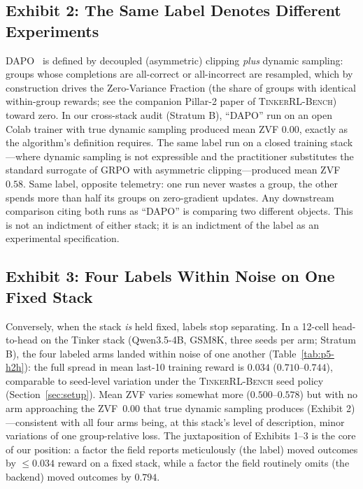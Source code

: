 \documentclass{article}  \usepackage[preprint,nonatbib]{neurips_2026} \usepackage[numbers]{natbib}
\newcommand{\ours}{\textsc{TinkerRL-Bench}}
\providecommand{\tableref}[1]{Table~\ref{#1}}
\providecommand{\secref}[1]{Section~\ref{#1}}
\begin{document}
\subsection{Exhibit 2: The Same Label Denotes Different Experiments}
\label{sec:p5-exhibit-label}
DAPO~\citep{yu2025dapo} is defined by decoupled (asymmetric) clipping
\emph{plus} dynamic sampling: groups whose completions are all-correct or
all-incorrect are resampled, which by construction drives the Zero-Variance
Fraction (the share of groups with identical within-group rewards; see the
companion Pillar-2 paper of \ours{}) toward zero. In our cross-stack audit
(Stratum B), ``DAPO'' run on an open Colab trainer with true dynamic sampling
produced mean ZVF $0.00$, exactly as the algorithm's definition requires. The
same label run on a closed training stack---where dynamic sampling is not
expressible and the practitioner substitutes the standard surrogate of GRPO
with asymmetric clipping---produced mean ZVF $0.58$. Same label, opposite
telemetry: one run never wastes a group, the other spends more than half its
groups on zero-gradient updates. Any downstream comparison citing both runs as
``DAPO'' is comparing two different objects. This is not an indictment of
either stack; it is an indictment of the label as an experimental
specification.

\subsection{Exhibit 3: Four Labels Within Noise on One Fixed Stack}
\label{sec:p5-exhibit-h2h}
Conversely, when the stack \emph{is} held fixed, labels stop separating. In a
12-cell head-to-head on the Tinker stack (Qwen3.5-4B, GSM8K, three seeds per
arm; Stratum B), the four labeled arms landed within noise of one another
(\tableref{tab:p5-h2h}): the full spread in mean last-10 training reward is
$0.034$ ($0.710$--$0.744$), comparable to seed-level variation under the
\ours{} seed policy (\secref{sec:setup}). Mean ZVF varies somewhat more
($0.500$--$0.578$) but with no arm approaching the ZVF~$0.00$ that true dynamic
sampling produces (Exhibit 2)---consistent with all four arms being, at this
stack's level of description, minor variations of one group-relative loss. The
juxtaposition of Exhibits 1--3 is the core of our position: a factor the field
reports meticulously (the label) moved outcomes by $\leq 0.034$ reward on a
fixed stack, while a factor the field routinely omits (the backend) moved
outcomes by $0.794$.
\end{document}
